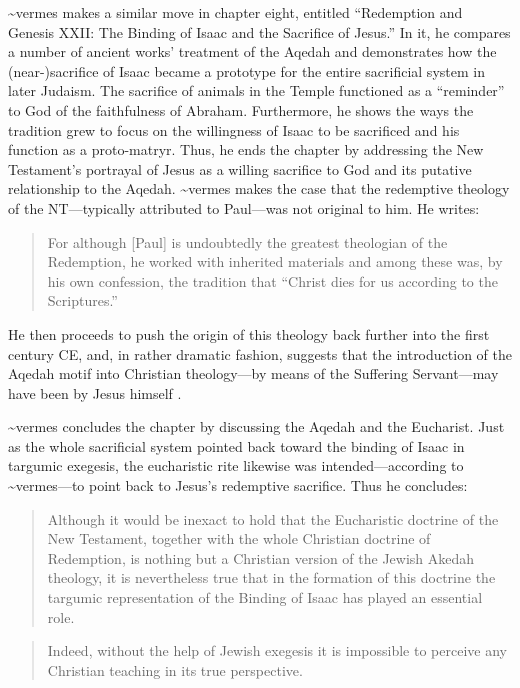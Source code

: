 \textasciitilde{}vermes makes a similar move in chapter eight, entitled
``Redemption and Genesis XXII: The Binding of Isaac and the Sacrifice of
Jesus.'' In it, he compares a number of ancient works' treatment of the
Aqedah and demonstrates how the (near-)sacrifice of Isaac became a
prototype for the entire sacrificial system in later Judaism. The
sacrifice of animals in the Temple functioned as a ``reminder'' to God
of the faithfulness of Abraham. Furthermore, he shows the ways the
tradition grew to focus on the willingness of Isaac to be sacrificed and
his function as a proto-matryr. Thus, he ends the chapter by addressing
the New Testament's portrayal of Jesus as a willing sacrifice to God and
its putative relationship to the Aqedah. \textasciitilde{}vermes makes
the case that the redemptive theology of the NT---typically attributed
to Paul---was not original to him. He writes:

\begin{quote}
For although {[}Paul{]} is undoubtedly the greatest theologian of the
Redemption, he worked with inherited materials and among these was, by
his own confession, the tradition that ``Christ dies for us according to
the Scriptures.''\autocite[221]{vermes1961}
\end{quote}

He then proceeds to push the origin of this theology back further into
the first century CE, and, in rather dramatic fashion, suggests that the
introduction of the Aqedah motif into Christian theology---by means of
the Suffering Servant---may have been by Jesus himself
\autocite[223]{vermes1961}.

\textasciitilde{}vermes concludes the chapter by discussing the Aqedah
and the Eucharist. Just as the whole sacrificial system pointed back
toward the binding of Isaac in targumic exegesis, the eucharistic rite
likewise was intended---according to \textasciitilde{}vermes---to point
back to Jesus's redemptive sacrifice. Thus he concludes:

\begin{quote}
Although it would be inexact to hold that the Eucharistic doctrine of
the New Testament, together with the whole Christian doctrine of
Redemption, is nothing but a Christian version of the Jewish Akedah
theology, it is nevertheless true that in the formation of this doctrine
the targumic representation of the Binding of Isaac has played an
essential role.
\end{quote}

\begin{quote}
Indeed, without the help of Jewish exegesis it is impossible to perceive
any Christian teaching in its true
perspective.\autocite[227]{vermes1961}
\end{quote}

